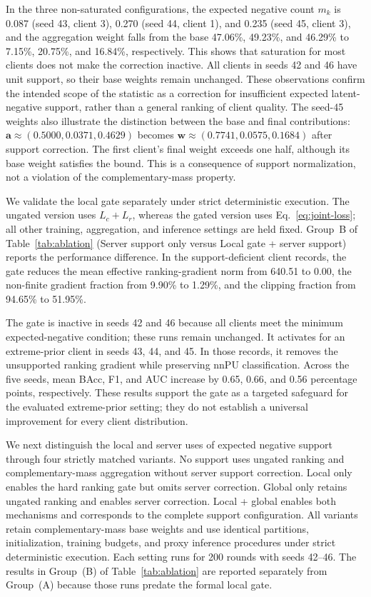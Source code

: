 \documentclass[lettersize,journal]{IEEEtran}
\begin{document}
In the three non-saturated configurations, the expected negative count $m_k$ is 0.087 (seed 43, client 3), 0.270 (seed 44, client 1), and 0.235 (seed 45, client 3), and the aggregation weight falls from the base 47.06\%, 49.23\%, and 46.29\% to 7.15\%, 20.75\%, and 16.84\%, respectively. This shows that saturation for most clients does not make the correction inactive. All clients in seeds 42 and 46 have unit support, so their base weights remain unchanged. These observations confirm the intended scope of the statistic as a correction for insufficient expected latent-negative support, rather than a general ranking of client quality. The seed-45 weights also illustrate the distinction between the base and final contributions: $\mathbf a\approx(0.5000,0.0371,0.4629)$ becomes $\mathbf w\approx(0.7741,0.0575,0.1684)$ after support correction. The first client's final weight exceeds one half, although its base weight satisfies the bound. This is a consequence of support normalization, not a violation of the complementary-mass property.

We validate the local gate separately under strict deterministic execution. The ungated version uses $L_c+L_r$, whereas the gated version uses Eq.~\eqref{eq:joint-loss}; all other training, aggregation, and inference settings are held fixed. Group~B of Table~\ref{tab:ablation} (Server support only versus Local gate + server support) reports the performance difference. In the support-deficient client records, the gate reduces the mean effective ranking-gradient norm from 640.51 to 0.00, the non-finite gradient fraction from 9.90\% to 1.29\%, and the clipping fraction from 94.65\% to 51.95\%.

The gate is inactive in seeds 42 and 46 because all clients meet the minimum expected-negative condition; these runs remain unchanged. It activates for an extreme-prior client in seeds 43, 44, and 45. In those records, it removes the unsupported ranking gradient while preserving nnPU classification. Across the five seeds, mean BAcc, F1, and AUC increase by 0.65, 0.66, and 0.56 percentage points, respectively. These results support the gate as a targeted safeguard for the evaluated extreme-prior setting; they do not establish a universal improvement for every client distribution.

We next distinguish the local and server uses of expected negative support through four strictly matched variants. No support uses ungated ranking and complementary-mass aggregation without server support correction. Local only enables the hard ranking gate but omits server correction. Global only retains ungated ranking and enables server correction. Local + global enables both mechanisms and corresponds to the complete support configuration. All variants retain complementary-mass base weights and use identical partitions, initialization, training budgets, and proxy inference procedures under strict deterministic execution. Each setting runs for 200 rounds with seeds 42--46. The results in Group~(B) of Table~\ref{tab:ablation} are reported separately from Group~(A) because those runs predate the formal local gate.
\end{document}
